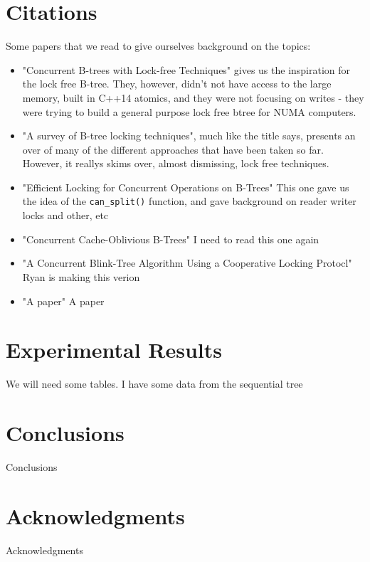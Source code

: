 \documentclass{sig-alternate}
\begin{document}
\section{Citations}
Some papers that we read to give ourselves background on the topics:
\begin{itemize}
  \item "Concurrent B-trees with Lock-free Techniques"\cite{sultana:lockfree} gives us the inspiration for the lock free B-tree.  They, however, didn't not have access to the large memory, built in C++14 atomics, and they were not focusing on writes - they were trying to build a general purpose lock free btree for NUMA computers.
  \item "A survey of B-tree locking techniques"\cite{graefe:survey}, much like the title says, presents an over of many of the different approaches that have been taken so far.  However, it reallys skims over, almost dismissing, lock free techniques.
  \item "Efficient Locking for Concurrent Operations on B-Trees" \cite{lehman:locking} This one gave us the idea of the \texttt{can\_split()} function, and gave background on reader writer locks and other, etc
  \item "Concurrent Cache-Oblivious B-Trees" \cite{bender:cache} I need to read this one again
  \item "A Concurrent Blink-Tree Algorithm Using a Cooperative Locking Protocl" \cite{lim:blink} Ryan is making this verion
  \item "A paper" A paper
\end{itemize}

\section{Experimental Results}
We will need some tables.  I have some data from the sequential tree

\section{Conclusions}
Conclusions

\section{Acknowledgments}
Acknowledgments



\end{document}
